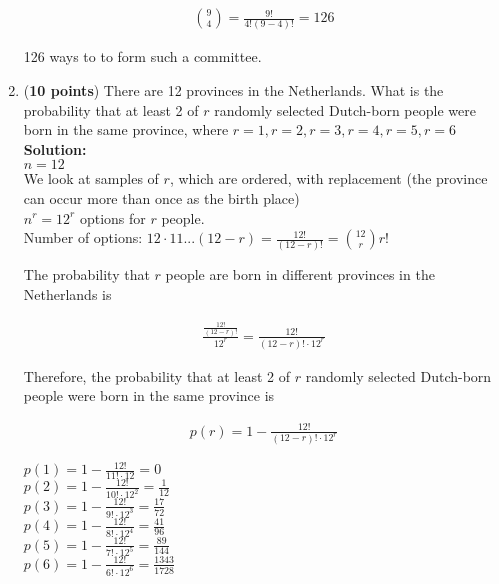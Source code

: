 \documentclass[a4paper]{article}
\begin{document}
\begin{enumerate}
\begin{align*}
{9 \choose 4} = \frac{9!}{4!(9-4)!} = 126
\end{align*}

126 ways to to form such a committee.\\

	
	
\item (\textbf{10 points}) There are 12 provinces in the Netherlands. What is the probability that at least 2 of $r$ randomly selected Dutch-born people were born in the same province, where $r = 1, r = 2, r = 3, r = 4, r = 5, r = 6$\\
\textbf{Solution:}\\
	
$n = 12$\\

We look at samples of $r$, which are ordered, with replacement (the province can occur more than once as the birth place)\\


$n^r = 12^r$ options for $r$ people.\\

Number of options: $12 \cdot 11 ... (12 - r) = \frac{12!}{(12-r)!} = {12 \choose r}r!$	
	
The probability that $r$ people are born in different provinces in the Netherlands is 

\begin{align*}
	\frac{\frac{12!}{(12-r)!}}{12^r} = \frac{12!}{(12-r)! \cdot 12^r}
\end{align*}	

Therefore, the probability that at least 2 of $r$ randomly selected Dutch-born people were born in the same province is 

\begin{align*}
p(r) = 1 - \frac{12!}{(12-r)! \cdot 12^r}
\end{align*}
	

$p(1) = 1 - \frac{12!}{11! \cdot 12} = 0$\\
$p(2) = 1 - \frac{12!}{10! \cdot 12^2} = \frac{1}{12}$\\
$p(3) = 1 - \frac{12!}{9! \cdot 12^3} = \frac{17}{72} $\\
$p(4) = 1 - \frac{12!}{8! \cdot 12^4} = \frac{41}{96}$\\
$p(5) = 1 - \frac{12!}{7! \cdot 12^5} = \frac{89}{144}$\\
$p(6) = 1 - \frac{12!}{6! \cdot 12^6} = \frac{1343}{1728}$\\
	
\end{enumerate}
\end{document}

